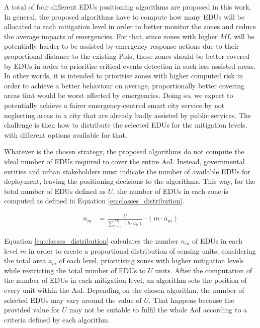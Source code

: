 \begin{refsection}
A total of four different EDUs positioning algorithms are proposed in this work. In general, the proposed algorithms have to compute how many EDUs will be allocated to each mitigation level in order to better monitor the zones and reduce the average impacts of emergencies. For that, since zones with higher $ML$ will be potentially harder to be assisted by emergency response actions due to their proportional distance to the existing PoIs, those zones should be better covered by EDUs in order to prioritise critical events detection in such less assisted areas. In other words, it is intended to prioritise zones with higher computed risk in order to achieve a better behaviour on average, proportionally better covering areas that would be worst affected by emergencies. Doing so, we expect to potentially achieve a fairer emergency-centred smart city service by not neglecting areas in a city that are already badly assisted by public services. The challenge is then how to distribute the selected EDUs for the mitigation levels, with different options available for that.

Whatever is the chosen strategy, the proposed algorithms do not compute the ideal number of EDUs required to cover the entire AoI. Instead, governmental entities and urban stakeholders must indicate the number of available EDUs for deployment, leaving the positioning decisions to the algorithms. This way, for the total number of EDUs defined as $U$, the number of EDUs in each zone is computed as defined in Equation \ref{eq:classes_distribution}.

\begin{equation}
    \label{eq:classes_distribution}
    \begin{split}
        \displaystyle n_m &= \frac{U}{\displaystyle\sum_{h = 1}^{|M|}\left(h \cdot a_h\right)} \cdot (m \cdot a_m)
    \end{split}
\end{equation}

Equation \ref{eq:classes_distribution} calculates the number $n_m$ of EDUs in each level $m$ in order to create a proportional distribution of sensing units, considering the total area $a_m$ of each level, prioritising zones with higher mitigation levels while restricting the total number of EDUs to $U$ units. After the computation of the number of EDUs in each mitigation level, an algorithm sets the position of every unit within the AoI. Depending on the chosen algorithm, the number of selected EDUs may vary around the value of $U$. That happens because the provided value for $U$ may not be suitable to fulfil the whole AoI according to a criteria defined by each algorithm.


\end{refsection}
